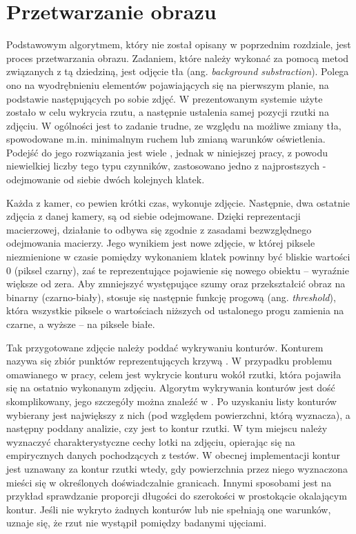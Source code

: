 \section{Przetwarzanie obrazu}
Podstawowym algorytmem, który nie został opisany w poprzednim rozdziale, jest proces przetwarzania obrazu. Zadaniem, które należy wykonać za pomocą metod związanych z tą dziedziną, jest odjęcie tła (ang. \textit{background substraction}). Polega ono na wyodrębnieniu elementów pojawiających się na pierwszym planie, na podstawie następujących po sobie zdjęć. W prezentowanym systemie użyte zostało w celu wykrycia rzutu, a następnie ustalenia samej pozycji rzutki na zdjęciu. W ogólności jest to zadanie trudne, ze względu na możliwe zmiany tła, spowodowane m.in. minimalnym ruchem lub zmianą warunków oświetlenia. Podejść do jego rozwiązania jest wiele \cite{LearningOpenCV}, jednak w niniejszej pracy, z powodu niewielkiej liczby tego typu czynników, zastosowano jedno z najprostszych - odejmowanie od siebie dwóch kolejnych klatek.

Każda z kamer, co pewien krótki czas, wykonuje zdjęcie. Następnie, dwa ostatnie zdjęcia z danej kamery, są od siebie odejmowane. Dzięki reprezentacji macierzowej, działanie to odbywa się zgodnie z zasadami bezwzględnego odejmowania macierzy. Jego wynikiem jest nowe zdjęcie, w której piksele niezmienione w czasie pomiędzy wykonaniem klatek powinny być bliskie wartości 0 (piksel czarny), zaś te reprezentujące pojawienie się nowego obiektu -- wyraźnie większe od zera. Aby zmniejszyć występujące szumy oraz przekształcić obraz na binarny (czarno-biały), stosuje się następnie funkcję progową (ang. \textit{threshold}), która wszystkie piksele o wartościach niższych od ustalonego progu zamienia na czarne, a wyższe -- na piksele białe. 

Tak przygotowane zdjęcie należy poddać wykrywaniu konturów. Konturem nazywa się zbiór punktów reprezentujących krzywą \cite{LearningOpenCV}. W przypadku problemu omawianego w pracy, celem jest wykrycie konturu wokół rzutki, która pojawiła się na ostatnio wykonanym zdjęciu. %
Algorytm wykrywania konturów jest dość skomplikowany, jego szczegóły można znaleźć w \cite{ContoursAlgorithm}. Po uzyskaniu listy konturów wybierany jest największy z nich (pod względem powierzchni, którą wyznacza), a następny poddany analizie, czy jest to kontur rzutki. W tym miejscu należy wyznaczyć charakterystyczne cechy lotki na zdjęciu, opierając się na empirycznych danych pochodzących z testów. W obecnej implementacji kontur jest uznawany za kontur rzutki wtedy, gdy powierzchnia przez niego wyznaczona mieści się w określonych doświadczalnie granicach. Innymi sposobami jest na przykład sprawdzanie proporcji długości do szerokości w prostokącie okalającym kontur.  Jeśli nie wykryto żadnych konturów lub nie spełniają one warunków, uznaje się, że rzut nie wystąpił pomiędzy badanymi ujęciami.

